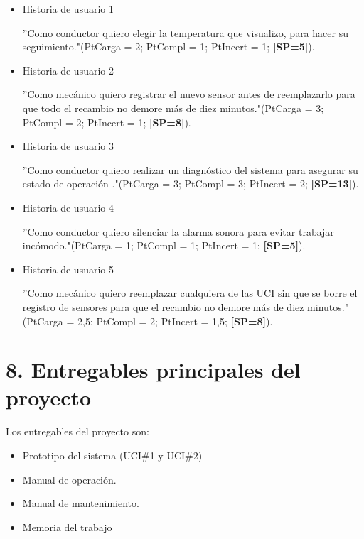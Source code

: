 \documentclass[
11pt, %
codirector, %
]{charter}
\begin{document}
\begin{itemize}

\item Historia de usuario 1

''Como conductor quiero elegir la temperatura que visualizo, para hacer su seguimiento."\newline (PtCarga = 2; PtCompl = 1; PtIncert = 1; \textbf{[SP=5]}).


\item Historia de usuario 2

''Como mecánico quiero registrar el nuevo sensor antes de reemplazarlo para que todo el recambio no demore más de diez minutos."\newline (PtCarga = 3; PtCompl = 2; PtIncert = 1; \textbf{[SP=8]}).

\item Historia de usuario 3

''Como conductor quiero realizar un diagnóstico del sistema para asegurar su estado de operación ."\newline (PtCarga = 3; PtCompl = 3; PtIncert = 2; \textbf{[SP=13]}).

\item Historia de usuario 4

''Como conductor quiero silenciar la alarma sonora para evitar trabajar incómodo."\newline (PtCarga = 1; PtCompl = 1; PtIncert = 1; \textbf{[SP=5]}).

\item Historia de usuario 5

''Como mecánico quiero reemplazar cualquiera de las UCI sin que se borre el registro de sensores para que el recambio no demore más de diez minutos."\newline (PtCarga = 2,5; PtCompl = 2; PtIncert = 1,5; \textbf{[SP=8]}).

\end{itemize}

\section{8. Entregables principales del proyecto}
\label{sec:entregables}

Los entregables del proyecto son:

\begin{itemize}
	\item Prototipo del sistema (UCI\#1 y UCI\#2)
	\item Manual de operación.
	\item Manual de mantenimiento.
	\item Memoria del trabajo
\end{itemize}
\end{document}
